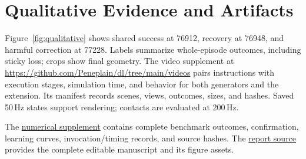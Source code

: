 \documentclass[letterpaper,10pt,conference]{ieeeconf}
\begin{document}
\section{Qualitative Evidence and Artifacts}
Figure~\ref{fig:qualitative} shows shared success at 76912, recovery at 76948, and harmful correction at 77228. Labels summarize whole-episode outcomes, including sticky loss; crops show final geometry. The video supplement at \url{https://github.com/Peneplain/dl/tree/main/videos} pairs instructions with execution stages, simulation time, and behavior for both generators and the extension. Its manifest records scenes, views, outcomes, sizes, and hashes. Saved 50\,Hz states support rendering; contacts are evaluated at 200\,Hz.

The \href{https://github.com/Peneplain/dl/tree/main/docs/results}{numerical supplement} contains complete benchmark outcomes, confirmation, learning curves, invocation/timing records, and source hashes. The \href{https://github.com/Peneplain/dl/tree/main/report}{report source} provides the complete editable manuscript and its figure assets.
\end{document}

